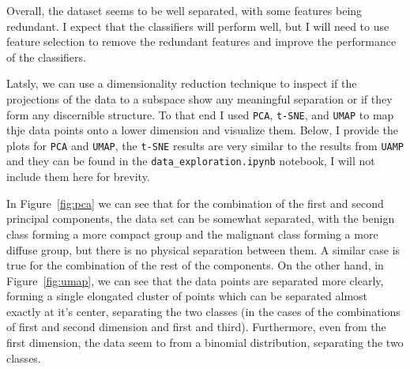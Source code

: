 \documentclass[12pt]{article}
\begin{document}
Overall, the dataset seems to be well separated, with some features being
redundant. I expect that the classifiers will perform well, but I will need to
use feature selection to remove the redundant features and improve the
performance of the classifiers.

Latsly, we can use a dimensionality reduction technique to inspect if the
projections of the data to a subspace show any meaningful separation or if they
form any discernible structure. To that end I used \texttt{PCA}, \texttt{t-SNE},
and \texttt{UMAP} to map thje data points onto a lower dimension and visualize
them. Below, I provide the plots for \texttt{PCA} and \texttt{UMAP}, the
\texttt{t-SNE} results are very similar to the results from \texttt{UAMP} and
they can be found in the \texttt{data\_exploration.ipynb} notebook, I will not
include them here for brevity.

In Figure~\ref{fig:pca} we can see that for the combination of the first and
second principal components, the data set can be somewhat separated, with the
benign class forming a more compact group and the malignant class forming a more
diffuse group, but there is no physical separation between them. A similar
case is true for the combination of the rest of the components. On the other
hand, in Figure~\ref{fig:umap}, we can see that the data points are separated
more clearly, forming a single elongated cluster of points which can be
separated almost exactly at it's center, separating the two classes (in the
cases of the combinations of first and second dimension and first and third).
Furthermore, even from the first dimension, the data seem to from a binomial
distribution, separating the two classes.
\end{document}
